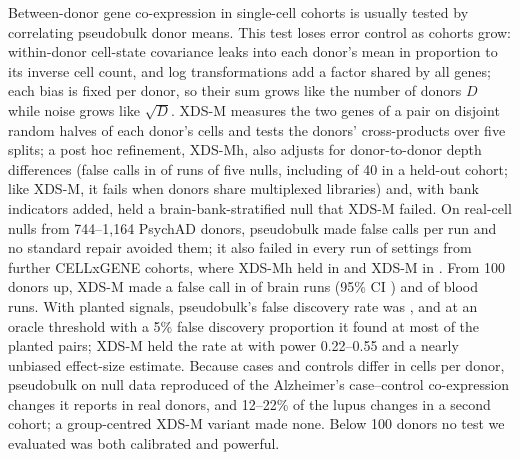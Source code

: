 Between-donor gene co-expression in single-cell cohorts is usually tested by correlating pseudobulk donor means. This test loses error control as cohorts grow: within-donor cell-state covariance leaks into each donor's mean in proportion to its inverse cell count, and log transformations add a factor shared by all genes; each bias is fixed per donor, so their sum grows like the number of donors $D$ while noise grows like $\sqrt D$. XDS-M measures the two genes of a pair on disjoint random halves of each donor's cells and tests the donors' cross-products over five splits; a post hoc refinement, XDS-Mh, also adjusts for donor-to-donor depth differences (false calls in \PeHk{} of \PeHn{} runs of five nulls, including \PeLAhSum{} of 40 in a held-out cohort; like XDS-M, it fails when donors share multiplexed libraries) and, with bank indicators added, held a brain-bank-stratified null that XDS-M failed. On real-cell nulls from 744--1{,}164 PsychAD donors, pseudobulk made \RfPBmean{} false calls per run and no standard repair avoided them; it also failed in every run of \BtN{} settings from \BtColl{} further CELLxGENE cohorts, where XDS-Mh held in \BtHheld{} and XDS-M in \BtXheld. From 100 donors up, XDS-M made a false call in \PoolBrainPct{} of \PoolBrainN{} brain runs (95\% CI \PoolBrainCI{}) and \PoolBloodK{} of \PoolBloodN{} blood runs. With planted signals, pseudobulk's false discovery rate was \SpPBfdr{}, and at an oracle threshold with a 5\% false discovery proportion it found at most \PeMatchPBpct{} of the planted pairs; XDS-M held the rate at \SpXfdr{} with power 0.22--0.55 and a nearly unbiased effect-size estimate. Because cases and controls differ in cells per donor, pseudobulk on null data reproduced \DCshare{} of the Alzheimer's case--control co-expression changes it reports in real donors, and 12--22\% of the lupus changes in a second cohort; a group-centred XDS-M variant made none. Below 100 donors no test we evaluated was both calibrated and powerful.
